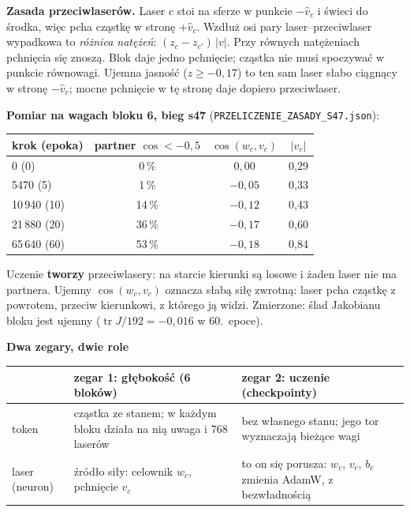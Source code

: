 \documentclass[a4paper,landscape,11pt]{article}
\begin{document}
\begin{minipage}[c]{0.5\linewidth}\small
\vspace{2mm}
\textbf{Zasada przeciwlaserów.} Laser $c$ stoi na sferze w punkcie $-\hat v_c$ i świeci do środka, więc pcha cząstkę w stronę $+\hat v_c$.
Wzdłuż osi pary laser–przeciwlaser wypadkowa to \emph{różnica natężeń}: $(z_c - z_{c'})\,|v|$.
Przy równych natężeniach pchnięcia się znoszą. Blok daje jedno pchnięcie; cząstka nie musi spoczywać w punkcie równowagi.
Ujemna jasność ($z\ge-0{,}17$) to ten sam laser słabo ciągnący w stronę $-\hat v_c$; mocne pchnięcie w tę stronę daje dopiero przeciwlaser.

\vspace{2mm}
\textbf{Pomiar na wagach bloku 6, bieg s47} (\texttt{PRZELICZENIE\_ZASADY\_S47.json}):\\[2pt]
\begin{tabular}{@{}lccc@{}}
\toprule
krok (epoka) & partner $\cos<-0{,}5$ & $\cos(w_c,v_c)$ & $|v_c|$ \\
\midrule
0 (0)          & 0\,\%  & $0{,}00$  & 0,29 \\
5470 (5)       & 1\,\%  & $-0{,}05$ & 0,33 \\
10\,940 (10)   & 14\,\% & $-0{,}12$ & 0,43 \\
21\,880 (20)   & 36\,\% & $-0{,}17$ & 0,60 \\
65\,640 (60)   & 53\,\% & $-0{,}18$ & 0,84 \\
\bottomrule
\end{tabular}

\vspace{2mm}
Uczenie \textbf{tworzy} przeciwlasery: na starcie kierunki są losowe i żaden laser nie ma partnera.
Ujemny $\cos(w_c,v_c)$ oznacza słabą siłę zwrotną: laser pcha cząstkę z powrotem, przeciw kierunkowi, z którego ją widzi.
Zmierzone: ślad Jakobianu bloku jest ujemny ($\operatorname{tr}J/192=-0{,}016$ w 60.~epoce).

\vspace{3mm}
\textbf{Dwa zegary, dwie role}\\[2pt]
\begin{tabular}{@{}>{\raggedright\arraybackslash}p{2.1cm}>{\raggedright\arraybackslash}p{4.0cm}>{\raggedright\arraybackslash}p{4.2cm}@{}}
\toprule
 & zegar 1: głębokość (6 bloków) & zegar 2: uczenie (checkpointy) \\
\midrule
token & cząstka ze stanem; w każdym bloku działa na nią uwaga i 768 laserów & bez własnego stanu; jego tor wyznaczają bieżące wagi \\
laser (neuron) & źródło siły: celownik $w_c$, pchnięcie $v_c$ & to on się porusza: $w_c$, $v_c$, $b_c$ zmienia AdamW, z bezwładnością \\
\bottomrule
\end{tabular}
\end{minipage}
\end{document}
